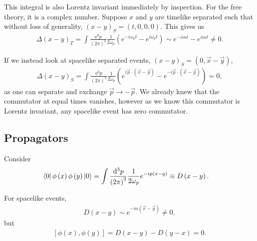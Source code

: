 This integral is also Lorentz invariant immediately by inspection. For the free theory, it is a complex number. Suppose $x$ and $y$ are timelike separated such that without loss of generality, $\left( x -y \right)_S = \left( t,0,0,0 \right) $. This gives us
\begin{align}
    \Delta \left( x -y \right)_T = \int \frac{\dd{^3p}}{\left( 2\pi \right)^3} \frac{1}{2 \omega_p} \left( e^{-i \omega_p t} - e^{i \omega_p t} \right) \sim  e^{-i m t} - e^{i m t} \neq 0
.\end{align}

If we instead look at spacelike separated events, $\left( x -y \right)_S = \left( 0, \vec{x} - \vec{y} \right) $,
\begin{align}
    \Delta \left( x -y \right)_S = \int \frac{\dd{^3p}}{\left( 2\pi \right)^3} \frac{1}{2 \omega_p} \left( e^{i \vec{p} \cdot \left( \vec{x}- \vec{y} \right) } - e^{-i \vec{p} \cdot \left( \vec{x} - \vec{y} \right) }\right) = 0
,\end{align}
as one can separate and exchange $\vec{p} \to - \vec{p}$. We already knew that the commutator at equal times vanishes, however as we know this commutator is Lorentz invariant, any spacelike event has zero commutator.


\subsection{Propagators}

Consider
\begin{align}
    \bra{0} \phi \left( x \right) \phi \left( y \right) \ket{0} &= \int \frac{\dd{^3p}}{\left( 2\pi \right)^{3}} \frac{1}{2 \omega_p} e^{-i p \left( x - y \right) } \equiv D \left( x -y \right) 
.\end{align}

For spacelike events, 
\begin{align}
    D \left( x -y \right) \sim  e^{-m \left( \vec{x} - \vec{y} \right) } \neq 0
,\end{align}
but
\begin{align}
    \left[ \phi \left( x \right) , \phi \left( y \right)  \right] = D \left( x -y \right) - D \left( y - x \right) = 0
.\end{align}






